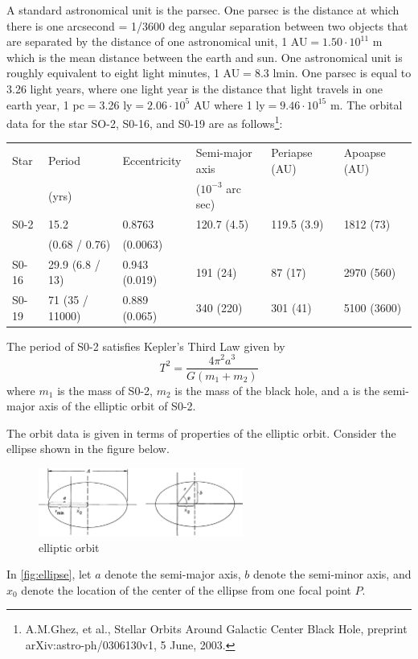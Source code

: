 \documentclass[solutions]{esg8012pset}
\begin{document}
\begin{solution}
    A standard astronomical unit is the parsec. One parsec is the distance at which there is one arcsecond = 1/3600 deg angular separation between two objects that are separated by the distance of one astronomical unit, 1 AU${} = 1.50 \cdot 10^{11}$ m which is the mean distance between the earth and sun. One astronomical unit is roughly equivalent to eight light minutes,  1 AU${} = 8.3$ lmin.  One parsec is equal to 3.26 light years, where one light year is the distance that light travels in one earth year, 1 pc${} = {}$3.26 ly${} = 2.06 \cdot 10^5$ AU where 1 ly${} = 9.46 \cdot 10^{15}$ m. The orbital data for the star SO-2, S0-16, and S0-19 are as follows\footnote{A.M.Ghez, et al., Stellar Orbits Around Galactic Center Black Hole, preprint arXiv:astro-ph/0306130v1, 5 June, 2003.}:
    \begin{center}
      \begin{tabular}{|l|l|l|l|l|l|}
        \hline Star  & Period          & Eccentricity  & Semi-major axis     & Periapse (AU) & Apoapse (AU) \\
                     & (yrs)           &               & ($10^{-3}$ arc sec) &               &              \\
        \hline S0-2  & 15.2            & 0.8763        & 120.7 (4.5)         & 119.5 (3.9)   & 1812 (73)    \\
                     & (0.68 / 0.76)   & (0.0063)      &                     &               &              \\
        \hline S0-16 & 29.9 (6.8 / 13) & 0.943 (0.019) & 191 (24)            & 87 (17)       & 2970 (560)   \\
        \hline S0-19 & 71 (35 / 11000) & 0.889 (0.065) & 340 (220)           & 301 (41)      & 5100 (3600)  \\ \hline
      \end{tabular}
    \end{center}
    The period of S0-2 satisfies Kepler's Third Law given by
    $$T^2 = \frac{4\pi^2 a^3}{G(m_1 + m_2)}$$
    where $m_1$ is the mass of S0-2, $m_2$ is the mass of the black hole, and a is the semi-major axis of the elliptic orbit of S0-2.

    The orbit data is given in terms of properties of the elliptic orbit. Consider the ellipse shown in the figure below.
    \begin{figure}[!h]
      \begin{center}\includegraphics[width=0.6\textwidth]{ps10_5}\end{center}
      \caption{elliptic orbit} \label{fig:ellipse}
    \end{figure}
    In \autoref{fig:ellipse}, let $a$ denote the semi-major axis, $b$ denote the semi-minor axis, and $x_0$ denote the location of the center of the ellipse from one focal point $P$.


\end{solution}
\end{document}
